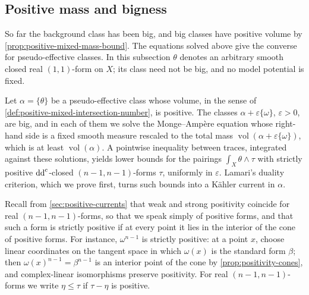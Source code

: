 \subsection{Positive mass and bigness}
\label{sec:positive-mass-bigness}

So far the background class has been big, and big classes have positive volume by \cref{prop:positive-mixed-mass-bound}. The equations solved above give the converse for pseudo-effective classes. In this subsection $\theta$ denotes an arbitrary smooth closed real $(1,1)$-form on $X$; its class need not be big, and no model potential is fixed.

Let $\alpha=\{\theta\}$ be a pseudo-effective class whose volume, in the sense of \cref{def:positive-mixed-intersection-number}, is positive. The classes $\alpha+\varepsilon\{\omega\}$, $\varepsilon>0$, are big, and in each of them we solve the Monge--Amp\`ere equation whose right-hand side is a fixed smooth measure rescaled to the total mass $\operatorname{vol}(\alpha+\varepsilon\{\omega\})$, which is at least $\operatorname{vol}(\alpha)$. A pointwise inequality between traces, integrated against these solutions, yields lower bounds for the pairings $\int_X\theta\wedge\tau$ with strictly positive $\mathrm{dd}^{\mathrm{c}}$-closed $(n-1,n-1)$-forms $\tau$, uniformly in $\varepsilon$. Lamari's duality criterion, which we prove first, turns such bounds into a K\"ahler current in $\alpha$.

Recall from \cref{sec:positive-currents} that weak and strong positivity coincide for real $(n-1,n-1)$-forms, so that we speak simply of positive forms, and that such a form is strictly positive if at every point it lies in the interior of the cone of positive forms. For instance, $\omega^{n-1}$ is strictly positive: at a point $x$, choose linear coordinates on the tangent space in which $\omega(x)$ is the standard form $\beta$; then $\omega(x)^{n-1}=\beta^{n-1}$ is an interior point of the cone by \cref{prop:positivity-cones}, and complex-linear isomorphisms preserve positivity. For real $(n-1,n-1)$-forms we write $\eta\leq\tau$ if $\tau-\eta$ is positive.

